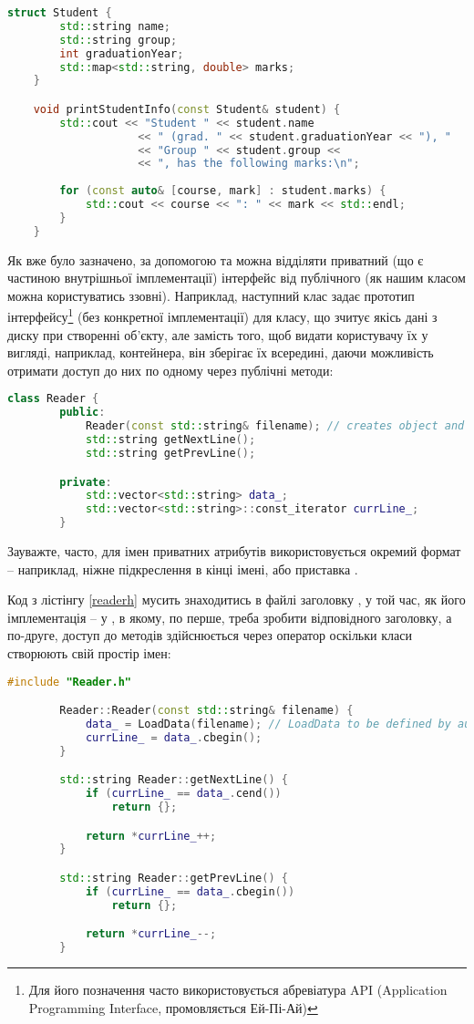 \documentclass[12pt]{article}
\begin{document}
	\begin{lstlisting}[language=c++]
	struct Student {
		std::string name;
		std::string group;
		int graduationYear;
		std::map<std::string, double> marks;
	}

	void printStudentInfo(const Student& student) {
		std::cout << "Student " << student.name
					<< " (grad. " << student.graduationYear << "), "
					<< "Group " << student.group <<
					<< ", has the following marks:\n";
		
		for (const auto& [course, mark] : student.marks) {
			std::cout << course << ": " << mark << std::endl;
		}
	}
	\end{lstlisting}
	
	Як вже було зазначено, за допомогою  та  можна відділяти приватний (що є частиною внутрішньої імплементації) інтерфейс від публічного (як нашим класом можна користуватись ззовні). Наприклад, наступний клас задає прототип інтерфейсу\footnote{Для його позначення часто використовується абревіатура API (Application Programming Interface, промовляється Ей-Пі-Ай)} (без конкретної імплементації) для класу, що зчитує якісь дані з диску при створенні об'єкту, але замість того, щоб видати користувачу їх у вигляді, наприклад, контейнера, він зберігає їх всередині, даючи можливість отримати доступ до них по одному через публічні методи:
	\begin{lstlisting}[language=c++,label=readerh,caption="Reader.h"]
		class Reader {
		public:
			Reader(const std::string& filename); // creates object and loads data
			std::string getNextLine();
			std::string getPrevLine();

		private:
			std::vector<std::string> data_;
			std::vector<std::string>::const_iterator currLine_;
		}
	\end{lstlisting}

	Зауважте, часто, для імен приватних атрибутів використовується окремий формат -- наприклад, ніжне підкреслення в кінці імені, або приставка .

	Код з лістінгу \ref{readerh} мусить знаходитись в файлі заголовку , у той час, як його імплементація -- у , в якому, по перше, треба зробити  відповідного заголовку, а по-друге, доступ до методів здійснюється через оператор \m{::} оскільки класи створюють свій простір імен:
	\begin{lstlisting}[language=c++,label=readercpp,caption="Reader.cpp"]
		#include "Reader.h"

		Reader::Reader(const std::string& filename) {
			data_ = LoadData(filename); // LoadData to be defined by author
			currLine_ = data_.cbegin();
		}

		std::string Reader::getNextLine() {
			if (currLine_ == data_.cend())
				return {};

			return *currLine_++;
		}

		std::string Reader::getPrevLine() {
			if (currLine_ == data_.cbegin())
				return {};

			return *currLine_--;
		}

	\end{lstlisting}
\end{document}
